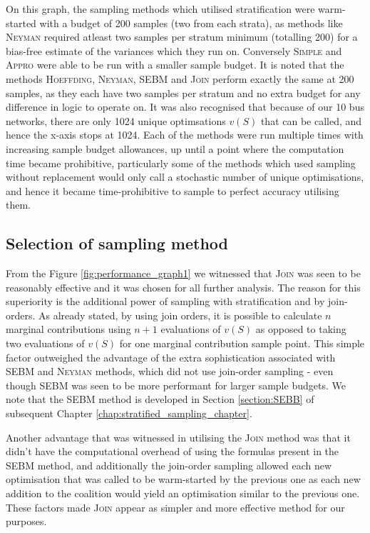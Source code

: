 On this graph, the sampling methods which utilised stratification were warm-started with a budget of 200 samples (two from each strata), as methods like \textsc{Neyman} required atleast two samples per stratum minimum (totalling 200) for a bias-free estimate of the variances which they run on.
Conversely \textsc{Simple} and \textsc{Appro} were able to be run with a smaller sample budget.
It is noted that the methods \textsc{Hoeffding}, \textsc{Neyman}, \textsc{SEBM} and \textsc{Join} perform exactly the same at 200 samples, as they each have two samples per stratum and no extra budget for any difference in logic to operate on.
It was also recognised that because of our 10 bus networks, there are only 1024 unique optimsations $v(S)$ that can be called, and hence the x-axis stops at 1024.
Each of the methods were run multiple times with increasing sample budget allowances, up until a point where the computation time became prohibitive, particularly some of the methods which used sampling without replacement would only call a stochastic number of unique optimisations, and hence it became time-prohibitive to sample to perfect accuracy utilising them.

\subsection{Selection of sampling method}\label{subsection:selection_of_sampling_method}

From the Figure \ref{fig:performance_graph1} we witnessed that \textsc{Join} was seen to be reasonably effective and it was chosen for all further analysis.
The reason for this superiority is the additional power of sampling with stratification and by join-orders.
As already stated, by using join orders, it is possible to calculate $n$ marginal contributions using $n+1$ evaluations of $v(S)$ as opposed to taking two evaluations of $v(S)$ for one marginal contribution sample point.
This simple factor outweighed the advantage of the extra sophistication associated with \textsc{SEBM} and \textsc{Neyman} methods, which did not use join-order sampling - even though SEBM was seen to be more performant for larger sample budgets.
We note that the \textsc{SEBM} method is developed in Section \ref{section:SEBB} of subsequent Chapter \ref{chap:stratified_sampling_chapter}.

Another advantage that was witnessed in utilising the \textsc{Join} method was that it didn't have the computational overhead of using the formulas present in the \textsc{SEBM} method, and additionally the join-order sampling allowed each new optimisation that was called to be warm-started by the previous one as each new addition to the coalition would yield an optimisation similar to the previous one.
These factors made \textsc{Join} appear as simpler and more effective method for our purposes.

